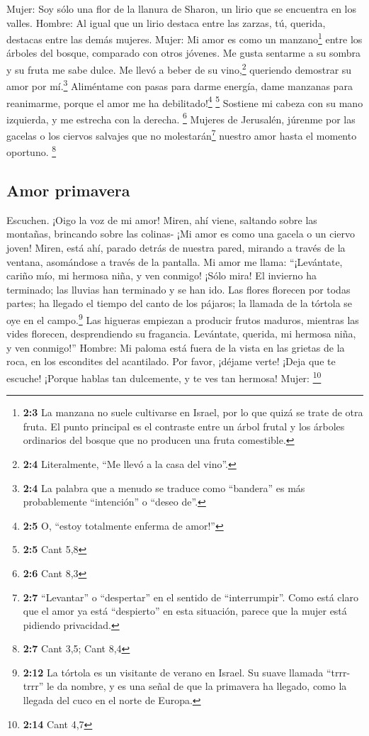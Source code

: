 Mujer:  Soy sólo una flor de la llanura de Sharon, un
lirio que se encuentra en los valles. Hombre:  Al igual
que un lirio destaca entre las zarzas, tú, querida, destacas entre las
demás mujeres. Mujer:  Mi amor es como un
manzano\footnote{\textbf{2:3} La manzana no suele cultivarse en Israel,
  por lo que quizá se trate de otra fruta. El punto principal es el
  contraste entre un árbol frutal y los árboles ordinarios del bosque
  que no producen una fruta comestible.} entre los árboles del bosque,
comparado con otros jóvenes. Me gusta sentarme a su sombra y su fruta me
sabe dulce.  Me llevó a beber de su vino,\footnote{\textbf{2:4}
  Literalmente, ``Me llevó a la casa del vino''.} queriendo demostrar su
amor por mí.\footnote{\textbf{2:4} La palabra que a menudo se traduce
  como ``bandera'' es más probablemente ``intención'' o ``deseo de''.}
 Aliméntame con pasas para darme energía, dame manzanas
para reanimarme, porque el amor me ha debilitado!\footnote{\textbf{2:5}
  O, ``estoy totalmente enferma de amor!''} \footnote{\textbf{2:5} Cant
  5,8}  Sostiene mi cabeza con su mano izquierda, y me
estrecha con la derecha. \footnote{\textbf{2:6} Cant 8,3} 
Mujeres de Jerusalén, júrenme por las gacelas o los ciervos salvajes que
no molestarán\footnote{\textbf{2:7} ``Levantar'' o ``despertar'' en el
  sentido de ``interrumpir''. Como está claro que el amor ya está
  ``despierto'' en esta situación, parece que la mujer está pidiendo
  privacidad.} nuestro amor hasta el momento oportuno. \footnote{\textbf{2:7}
  Cant 3,5; Cant 8,4}

\hypertarget{amor-primavera}{%
\subsection{Amor primavera}\label{amor-primavera}}

 Escuchen. ¡Oigo la voz de mi amor! Miren, ahí viene,
saltando sobre las montañas, brincando sobre las colinas- 
¡Mi amor es como una gacela o un ciervo joven! Miren, está ahí, parado
detrás de nuestra pared, mirando a través de la ventana, asomándose a
través de la pantalla.  Mi amor me llama: ``¡Levántate,
cariño mío, mi hermosa niña, y ven conmigo! ¡Sólo mira! 
El invierno ha terminado; las lluvias han terminado y se han ido.
 Las flores florecen por todas partes; ha llegado el
tiempo del canto de los pájaros; la llamada de la tórtola se oye en el
campo.\footnote{\textbf{2:12} La tórtola es un visitante de verano en
  Israel. Su suave llamada ``trrr-trrr'' le da nombre, y es una señal de
  que la primavera ha llegado, como la llegada del cuco en el norte de
  Europa.}  Las higueras empiezan a producir frutos
maduros, mientras las vides florecen, desprendiendo su fragancia.
Levántate, querida, mi hermosa niña, y ven conmigo!'' Hombre:
 Mi paloma está fuera de la vista en las grietas de la
roca, en los escondites del acantilado. Por favor, ¡déjame verte! ¡Deja
que te escuche! ¡Porque hablas tan dulcemente, y te ves tan hermosa!
Mujer: \footnote{\textbf{2:14} Cant 4,7}

